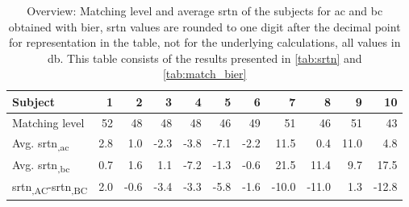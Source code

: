 \begin{table}[H]
\centering
\caption{Overview: Matching level and average \gls{srtn} of the subjects for \gls{ac} and \gls{bc} obtained with \gls{bier}, \gls{srtn} values are rounded to one digit after the decimal point for representation in the table, not for the underlying calculations, all values in \si{\decibel}. This table consists of the results presented in \autoref{tab:srtn} and \autoref{tab:match_bier}}
\label{tab:combined_data}
\begin{tabular}{l|rrrrrrrrrr}
Subject     & 1   & 2    & 3    & 4    & 5    & 6    & 7     & 8     & 9    & 10   \\ \hline
Matching level & 52 & 48  & 48 & 48 & 46 & 49 & 51  & 46   & 51 & 43  \\
Avg. \gls{srtn}\textsubscript{,\gls{ac}} & 2.8 & 1.0  & -2.3 & -3.8 & -7.1 & -2.2 & 11.5  & 0.4   & 11.0 & 4.8  \\
Avg. \gls{srtn}\textsubscript{,\gls{bc}} & 0.7 & 1.6  & 1.1  & -7.2 & -1.3 & -0.6 & 21.5  & 11.4  & 9.7  & 17.5 \\
\gls{srtn}\textsubscript{,AC}-\gls{srtn}\textsubscript{,BC}  & 2.0 & -0.6 & -3.4 & -3.3 & -5.8 & -1.6 & -10.0 & -11.0 & 1.3  & -12.8
\end{tabular}
\end{table}

